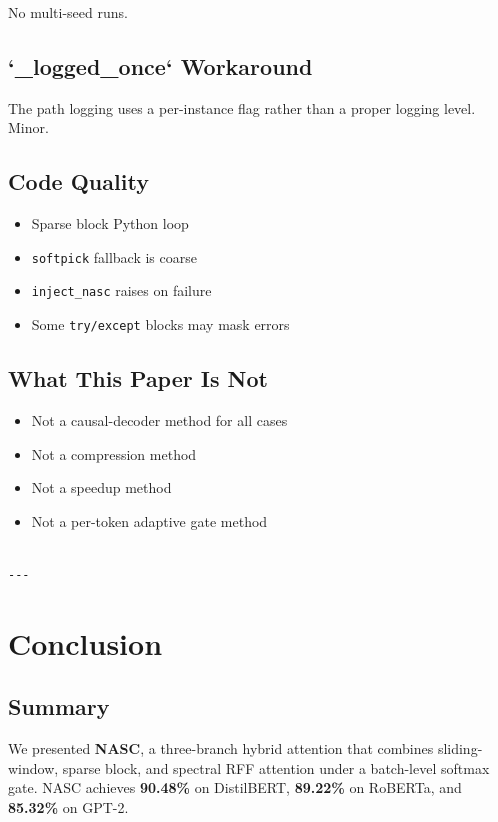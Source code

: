 No multi-seed runs.

\subsection{`\_logged\_once` Workaround}

The path logging uses a per-instance flag rather than a proper logging 
level. Minor.

\subsection{Code Quality}

\begin{itemize}
\item Sparse block Python loop
\item \texttt{softpick} fallback is coarse
\item \texttt{inject\_nasc} raises on failure
\item Some \texttt{try/except} blocks may mask errors

\end{itemize}
\subsection{What This Paper Is Not}

\begin{itemize}
\item Not a causal-decoder method for all cases
\item Not a compression method
\item Not a speedup method
\item Not a per-token adaptive gate method
\end{itemize}
\begin{lstlisting}

---
\end{lstlisting}


\section{Conclusion}

\subsection{Summary}

We presented \textbf{NASC}, a three-branch hybrid attention that combines 
sliding-window, sparse block, and spectral RFF attention under a batch-level 
softmax gate. NASC achieves \textbf{90.48\%} on DistilBERT, \textbf{89.22\%} 
on RoBERTa, and \textbf{85.32\%} on GPT-2.

